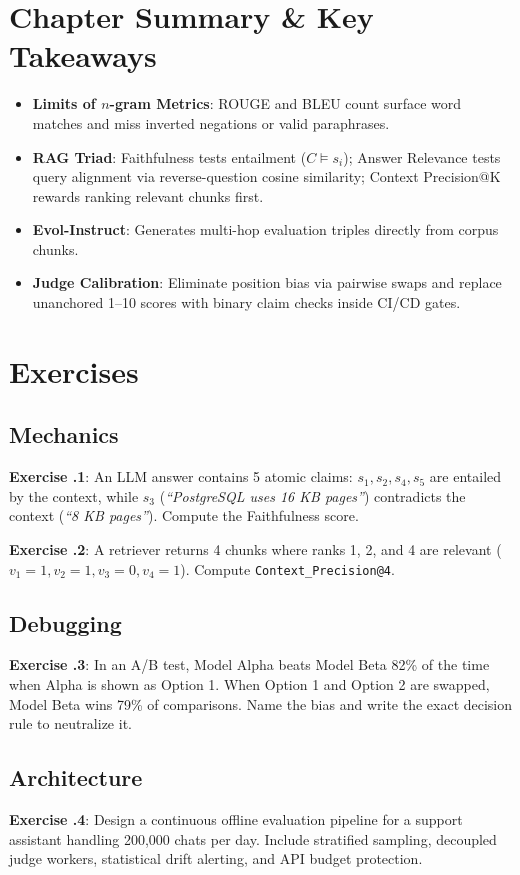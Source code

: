 \section{Chapter Summary \protect\& Key Takeaways}
\begin{itemize}[leftmargin=18pt]
  \item \textbf{Limits of $n$-gram Metrics}: ROUGE and BLEU count surface word matches and miss inverted negations or valid paraphrases.
  \item \textbf{RAG Triad}: Faithfulness tests entailment ($C \models s_i$); Answer Relevance tests query alignment via reverse-question cosine similarity; Context Precision@K rewards ranking relevant chunks first.
  \item \textbf{Evol-Instruct}: Generates multi-hop evaluation triples directly from corpus chunks.
  \item \textbf{Judge Calibration}: Eliminate position bias via pairwise swaps and replace unanchored 1--10 scores with binary claim checks inside CI/CD gates.
\end{itemize}

\section{Exercises}

\subsection*{Mechanics}
\textbf{Exercise \thechapter.1}: An LLM answer contains 5 atomic claims: $s_1, s_2, s_4, s_5$ are entailed by the context, while $s_3$ (\emph{``PostgreSQL uses 16 KB pages''}) contradicts the context (\emph{``8 KB pages''}). Compute the Faithfulness score.

\textbf{Exercise \thechapter.2}: A retriever returns 4 chunks where ranks 1, 2, and 4 are relevant ($v_1=1, v_2=1, v_3=0, v_4=1$). Compute \texttt{Context\_Precision@4}.

\subsection*{Debugging}
\textbf{Exercise \thechapter.3}: In an A/B test, Model Alpha beats Model Beta 82\% of the time when Alpha is shown as Option 1. When Option 1 and Option 2 are swapped, Model Beta wins 79\% of comparisons. Name the bias and write the exact decision rule to neutralize it.

\subsection*{Architecture}
\textbf{Exercise \thechapter.4}: Design a continuous offline evaluation pipeline for a support assistant handling 200,000 chats per day. Include stratified sampling, decoupled judge workers, statistical drift alerting, and API budget protection.

